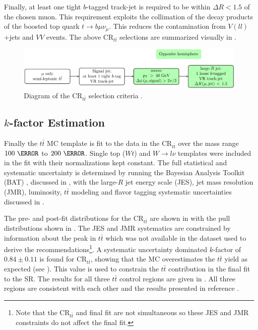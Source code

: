 Finally, at least one tight $b$-tagged track-jet is required to be within
$\Delta R < 1.5$ of the chosen muon.  This requirement exploits the collimation
of the decay products of the boosted top quark $t \rightarrow
b\mu\nu_{\mu}$.  This reduces the contamination from $V(ll)$+jets
and $VV$ events. The above $\text{CR}_{t\bar{t}}$ selections are summarized visually in .

\begin{figure}[!htbp]
\centering
\includegraphics[width=1.0\linewidth]{figures/backgrounds/ttbar_selection}
\caption{Diagram of the $\text{CR}_{t\bar{t}}$ selection criteria \cite {Feickert:2690521}.}
\label{sec:background:ttbar_selection_diagram}
\end{figure}

\subsection{$k$-factor Estimation}

Finally the $t\bar{t}$ MC template is fit to the data in the
$\text{CR}_{t\bar{t}}$ over the mass range $100~\GeV$ to $200~\GeV$.  Single
top ($Wt$) and $W \rightarrow l\nu$ templates were included in the fit with
their normalizations kept constant. The full statistical and systematic
uncertainty is determined by running the Bayesian Analysis Toolkit (BAT)
\cite{Beaujean:2011zz}, discussed in , with the large-$R$ jet
energy scale (JES), jet mass resolution (JMR), luminosity, $t\bar{t}$
modeling and flavor tagging systematic uncertainties discussed in
.

The pre- and post-fit distributions for the $\text{CR}_{t\bar{t}}$ are shown in
 with the pull distributions shown in
.  The JES and JMR systematics are constrained
by information about the peak in $t\bar{t}$ which was not available in the
dataset used to derive the recommendations\footnote{Note that the
$\text{CR}_{t\bar{t}}$ and final fit are not simultaneous so these JES and JMR
constraints do not affect the final fit.}. A systematic uncertainty dominated
$k$-factor of $0.84 \pm 0.11$ is found for $\text{CR}_{t\bar{t}}$, showing that
the MC overestimates the $t\bar{t}$ yield as expected (see
). This value is used to constrain the
$t\bar{t}$ contribution in the final fit to the SR. The results for all three
$t\bar{t}$ control regions are given in .  All three
regions are consistent with each other and the results presented in reference
\cite{ATLAS:2016jct}.

